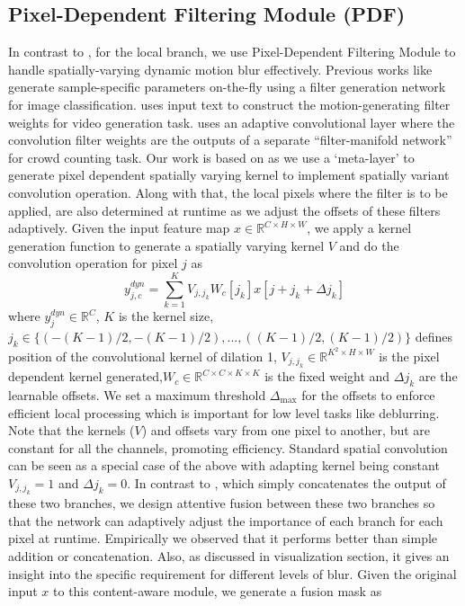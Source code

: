 \documentclass[10pt,twocolumn,letterpaper]{article}
\begin{document}
\subsection{Pixel-Dependent Filtering Module (PDF)}
In contrast to \cite{bello2019attention}, for the local branch, we use Pixel-Dependent Filtering Module to handle spatially-varying dynamic motion blur effectively. Previous works like \cite{jia2016dynamic} generate sample-specific parameters on-the-fly using a filter generation network for image classification. \cite{li2018video} uses input text to construct the motion-generating filter weights for video generation task. \cite{zhang2018crowd} uses an adaptive convolutional layer where the convolution filter weights are the outputs of a separate “filter-manifold network” for crowd counting task. Our work is based on \cite{su2019pixel} as we use a ‘meta-layer’ to generate pixel dependent spatially varying kernel to implement spatially variant convolution operation. Along with that, the local pixels where the filter is to be applied, are also determined at runtime as we adjust the offsets of these filters adaptively. Given the input feature map $x \in  \mathbb{R}^{C \times H \times W}$, we apply a kernel generation function to generate a spatially varying kernel $V$ and do the convolution operation for pixel $j$ as
\begin{equation}
    y^{dyn}_{j,c}  = \sum_{k = 1}^{K} V_{j,j_k} W_c[j_k] x[j+j_k + \Delta j_k]
\end{equation}
where $y^{dyn}_j \in \mathbb{R}^C$, $K$ is the kernel size, $j_k \in \{(-(K-1)/2,-(K-1)/2),...,((K-1)/2,(K-1)/2)\}$ defines position of the convolutional kernel of dilation 1, $V_{j,j_k} \in \mathbb{R}^{{K^2} \times H \times W}$ is the pixel dependent kernel generated,$W_c \in \mathbb{R}^{C\times C\times K \times K}$ is the fixed weight and $\Delta j_k$ are the learnable offsets. We set a maximum threshold $\Delta_{\text{max}}$ for the offsets to enforce efficient local processing which is important for low level tasks like deblurring.  Note that the kernels ($V$) and offsets vary from one pixel to another, but are constant for all the channels, promoting efficiency. Standard spatial convolution can be seen as a special case of the above with adapting kernel being constant $V_{j,j_k} = 1$ and $\Delta j_k = 0$.
In contrast to \cite{bello2019attention}, which simply concatenates the output of these two branches, we design attentive fusion between these two branches so that the network can adaptively adjust the importance of each branch for each pixel at runtime. Empirically we observed that it performs better than simple addition or concatenation. Also, as discussed in visualization section, it gives an insight into the specific requirement for different levels of blur. Given the original input $x$ to this content-aware module, we generate a fusion mask as
\end{document}
